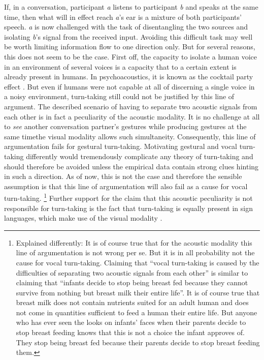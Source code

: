 If, in a conversation, participant \emph{a} listens to participant \emph{b} and speaks at the same time, then what will in effect reach \emph{a}'s ear is a mixture of both participants' speech.
\emph{a} is now challenged with the task of disentangling the two sources and isolating \emph{b}'s signal from the received input.
Avoiding this difficult task may well be worth limiting information flow to one direction only.
But for several reasons, this does not seem to be the case.
First off, the capacity to isolate a human voice in an environment of several voices is a capacity that to a certain extent is already present in humans.
In psychoacoustics, it is known as the cocktail party effect \citep[first mentioned in][a more recent review is given in \citeauthor{arons_review_1992}, \citeyear{arons_review_1992}]{pollack_cocktail_1957}.
But even if humans were not capable at all of discerning a single voice in a noisy environment, turn-taking still could not be justified by this line of argument. The described scenario of having to separate two acoustic signals from each other is in fact a peculiarity of the acoustic modality.
It is no challenge at all to \emph{see} another conversation partner's gestures while producing gestures at the same time\dash the visual modality allows such simultaneity.
Consequently, this line of argumentation fails for gestural turn-taking.
Motivating gestural and vocal turn-taking differently would tremendously complicate any theory of turn-taking and should therefore be avoided unless the empirical data contain strong clues hinting in such a direction.
As of now, this is not the case and therefore the sensible assumption is that this line of argumentation will also fail as a cause for vocal turn-taking.%
\footnote{
Explained differently:
It is of course true that for the acoustic modality this line of argumentation is not wrong per se.
But it is in all probability not the cause for vocal turn-taking.
Claiming that ``vocal turn-taking is caused by the difficulties of separating two acoustic signals from each other'' is similar to claiming that ``infants decide to stop being breast fed because they cannot survive from nothing but breast milk their entire life''.
It is of course true that breast milk does not contain nutrients suited for an adult human and does not come in quantities sufficient to feed a human their entire life.
But anyone who has ever seen the looks on infants' faces when their parents decide to stop breast feeding knows that this is not a choice the infant approves of.
They stop being breast fed because their parents decide to stop breast feeding them.}
Further support for the claim that this acoustic peculiarity is not responsible for turn-taking is the fact that turn-taking is equally present in sign languages, which make use of the visual modality \citep[see e.g.][among many others]{devos_turn-timing_2015,girard-groeber_management_2015, groeber_turns_2014,manrique_suspending_2015,mcclearly_turn-taking_2013}.

